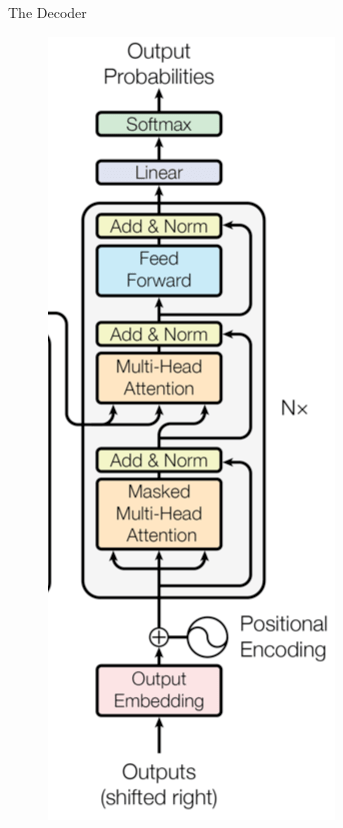 \documentclass[handout]{beamer}
\begin{document}
\begin{frame}{The Decoder}

     \begin{figure}[h]
        	\includegraphics[scale = 0.29]{pics/transformerdecoder.png}
        \end{figure}  


\end{frame}
\end{document}
